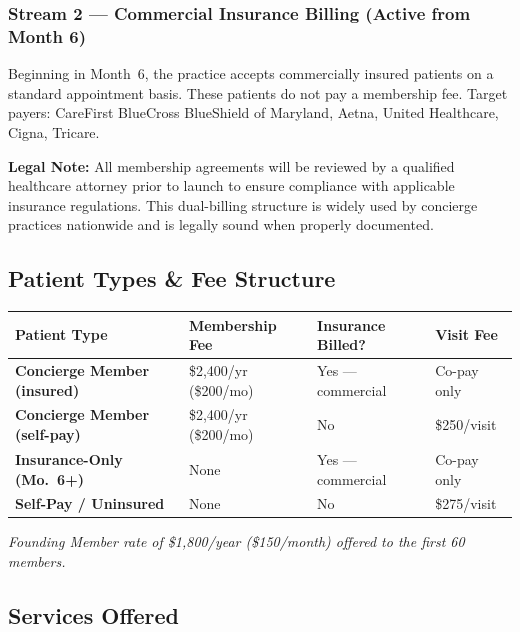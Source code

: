 \documentclass[11pt,letterpaper]{article}
\newcommand{\thead}[1]{\cellcolor{navy}\color{white}\bfseries\small #1}
\newcommand{\trow}{\rowcolor{rowshade}}
\begin{document}
\subsubsection{Stream 2 --- Commercial Insurance Billing (Active from Month 6)}

Beginning in Month~6, the practice accepts commercially insured patients on a standard appointment basis. These patients do not pay a membership fee. Target payers: CareFirst BlueCross BlueShield of Maryland, Aetna, United Healthcare, Cigna, Tricare.

\medskip
\textbf{Legal Note:} All membership agreements will be reviewed by a qualified healthcare attorney prior to launch to ensure compliance with applicable insurance regulations. This dual-billing structure is widely used by concierge practices nationwide and is legally sound when properly documented.

\subsection{Patient Types \& Fee Structure}

\vspace{6pt}
\begin{tabularx}{\linewidth}{|>{\bfseries\small}p{3.0cm}|>{\small}X|>{\small}p{2.8cm}|>{\small}p{2.0cm}|}
\hline
\thead{Patient Type} & \thead{Membership Fee} & \thead{Insurance Billed?} & \thead{Visit Fee} \\
\hline
\trow Concierge Member (insured) & \$2,400/yr (\$200/mo) & Yes --- commercial & Co-pay only \\
Concierge Member (self-pay) & \$2,400/yr (\$200/mo) & No & \$250/visit \\
\trow Insurance-Only (Mo.\ 6+) & None & Yes --- commercial & Co-pay only \\
Self-Pay / Uninsured & None & No & \$275/visit \\
\hline
\end{tabularx}
\vspace{4pt}

\textit{\small *Founding Member rate of \$1,800/year (\$150/month) offered to the first 60 members.}

\subsection{Services Offered}
\end{document}
